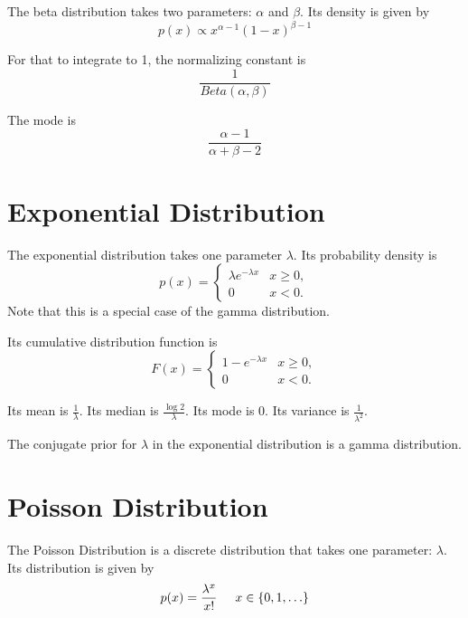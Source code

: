 \documentclass[12pt]{article}
\begin{document}
The beta distribution takes two parameters: $\alpha$ and $\beta$. Its density is given by
\begin{equation*}
p(x) \propto  x^{\alpha-1}(1-x)^{\beta-1}
\end{equation*}

For that to integrate to 1, the normalizing constant is
\begin{equation*}
\frac{1}{Beta(\alpha,\beta)}
\end{equation*}

The mode is
\begin{equation*}
\frac{\alpha - 1} {\alpha + \beta - 2}
\end{equation*}

\section*{Exponential Distribution}

The exponential distribution takes one parameter $\lambda$. Its probability density is
\begin{equation*}
p(x) = \begin{cases}
\lambda e^{-\lambda x} & x \ge 0, \\
0 & x < 0.
\end{cases}
\end{equation*}
Note that this is a special case of the gamma distribution.

Its cumulative distribution function is
\begin{equation*}
F(x) = \begin{cases}
1-e^{-\lambda x} & x \ge 0, \\
0 & x < 0.
\end{cases}
\end{equation*}

Its mean is $\frac{1}{\lambda}$. Its median is $\frac{\log{2}}{\lambda}$. Its mode is 0. Its variance is $\frac{1}{\lambda^2}$.

The conjugate prior for $\lambda$ in the exponential distribution is a gamma distribution.

\section*{Poisson Distribution}

The Poisson Distribution is a discrete distribution that takes one parameter: $\lambda$. Its distribution is given by
\begin{equation*}
p(x) = \frac{\lambda^x}{x!} \hspace{5mm}  x \in \lbrace 0, 1, \ldots\rbrace
\end{equation*}
\end{document}
